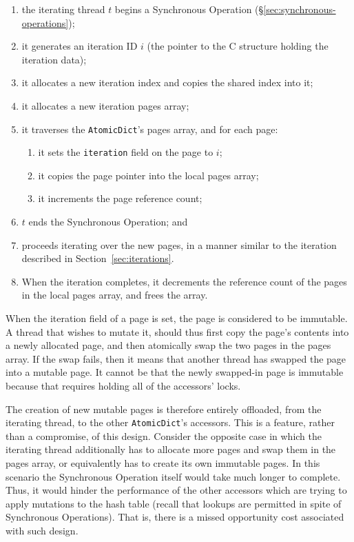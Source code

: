 \begin{enumerate}
    \item the iterating thread $t$ begins a Synchronous Operation (\S\ref{sec:synchronous-operations});
    \item it generates an iteration ID $i$ (the pointer to the C structure holding the iteration data);
    \item it allocates a new iteration index and copies the shared index into it;
    \item it allocates a new iteration pages array;
    \item it traverses the \texttt{AtomicDict}'s pages array, and for each page:
    \begin{enumerate}
        \item it sets the \texttt{iteration} field on the page to $i$;
        \item it copies the page pointer into the local pages array;
        \item it increments the page reference count;
    \end{enumerate}
    \item $t$ ends the Synchronous Operation; and
    \item proceeds iterating over the new pages, in a manner similar to the iteration described in Section~\ref{sec:iterations}.
    \item When the iteration completes, it decrements the reference count of the pages in the local pages array, and frees the array.
\end{enumerate}

When the iteration field of a page is set, the page is considered to be immutable.
A thread that wishes to mutate it, should thus first copy the page's contents into a newly allocated page, and then atomically swap the two pages in the pages array.
If the swap fails, then it means that another thread has swapped the page into a mutable page.
It cannot be that the newly swapped-in page is immutable because that requires holding all of the accessors' locks.

The creation of new mutable pages is therefore entirely offloaded, from the iterating thread, to the other \texttt{AtomicDict}'s accessors.
This is a feature, rather than a compromise, of this design.
Consider the opposite case in which the iterating thread additionally has to allocate more pages and swap them in the pages array, or equivalently has to create its own immutable pages.
In this scenario the Synchronous Operation itself would take much longer to complete.
Thus, it would hinder the performance of the other accessors which are trying to apply mutations to the hash table (recall that lookups are permitted in spite of Synchronous Operations).
That is, there is a missed opportunity cost associated with such design.

